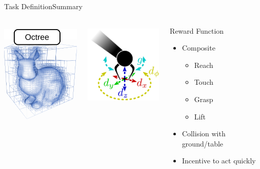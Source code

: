 \begin{frame}{Task Definition}{Summary}
    \begin{columns}%
        \begin{column}{0.3\textwidth}%
            \centering
            \includegraphics[height=5cm]{graphics/3d_data_representations_only_octree_cropped.pdf}
        \end{column}
        \begin{column}{0.3\textwidth}%
            \centering
            \includegraphics[height=4cm]{graphics/action_space.pdf}
        \end{column}
        \begin{column}{0.35\textwidth}%
            \begin{block}{Reward Function}
                \begin{itemize}
                    \item Composite
                          \begin{itemize}
                              \item Reach
                              \item Touch
                              \item Grasp
                              \item Lift
                          \end{itemize}
                    \item Collision with ground/table
                    \item Incentive to act quickly
                \end{itemize}
            \end{block}
        \end{column}
    \end{columns}
\end{frame}


